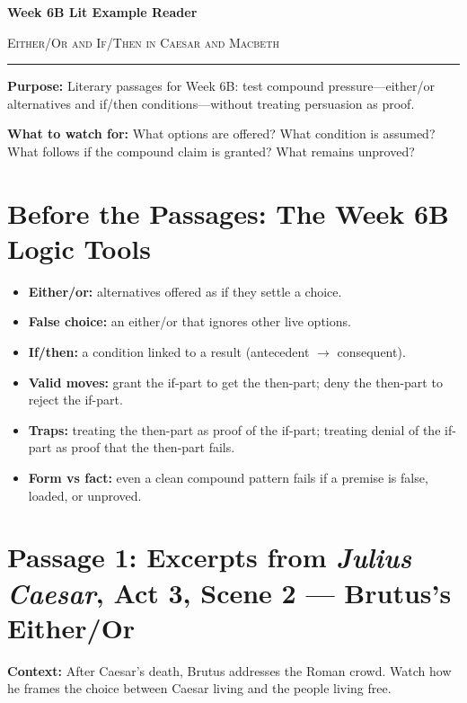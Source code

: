 \documentclass[12pt]{article}
\begin{document}
\begin{center}
{\LARGE\bfseries Week 6B Lit Example Reader}\par\vspace{0.02em}
{\large\scshape Either/Or and If/Then in Caesar and Macbeth}\par\vspace{0.08em}
\rule{0.78\textwidth}{0.5pt}
\end{center}

\textbf{Purpose:} Literary passages for Week 6B: test compound pressure---either/or alternatives and if/then conditions---without treating persuasion as proof.

\textbf{What to watch for:} What options are offered? What condition is assumed? What follows if the compound claim is granted? What remains unproved?

\section*{Before the Passages: The Week 6B Logic Tools}

\begin{itemize}[leftmargin=1.3em,itemsep=0.08em,topsep=0.1em,parsep=0.04em]
\item \textbf{Either/or:} alternatives offered as if they settle a choice.
\item \textbf{False choice:} an either/or that ignores other live options.
\item \textbf{If/then:} a condition linked to a result (antecedent $\rightarrow$ consequent).
\item \textbf{Valid moves:} grant the if-part to get the then-part; deny the then-part to reject the if-part.
\item \textbf{Traps:} treating the then-part as proof of the if-part; treating denial of the if-part as proof that the then-part fails.
\item \textbf{Form vs fact:} even a clean compound pattern fails if a premise is false, loaded, or unproved.
\end{itemize}

\section*{Passage 1: Excerpts from \textit{Julius Caesar}, Act 3, Scene 2 --- Brutus's Either/Or}

\textbf{Context:} After Caesar's death, Brutus addresses the Roman crowd. Watch how he frames the choice between Caesar living and the people living free.
\end{document}
